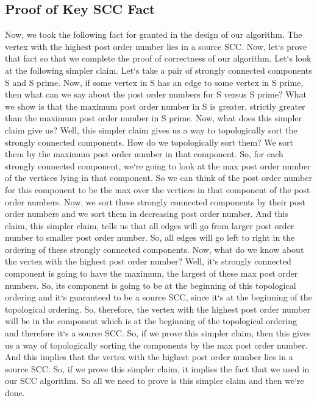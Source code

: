 \subsection{Proof of Key SCC Fact}
Now, we took the following fact for granted in the design of our algorithm.
The vertex with the highest post order number lies in a source SCC\@.
Now, let`s prove that fact so that we complete the proof of correctness of our algorithm.
Let`s look at the following simpler claim.
Let`s take a pair of strongly connected components S and S prime.
Now, if some vertex in S has an edge to some vertex in S prime, then what can we say about the post order numbers for S versus S prime? What we show is that the maximum post order number in S is greater, strictly greater than the maximum post order number in S prime.
Now, what does this simpler claim give us? Well, this simpler claim gives us a way to topologically sort the strongly connected components.
How do we topologically sort them? We sort them by the maximum post order number in that component.
So, for each strongly connected component, we`re going to look at the max post order number of the vertices lying in that component.
So we can think of the post order number for this component to be the max over the vertices in that component of the post order numbers.
Now, we sort these strongly connected components by their post order numbers and we sort them in decreasing post order number.
And this claim, this simpler claim, tells us that all edges will go from larger post order number to smaller post order number.
So, all edges will go left to right in the ordering of these strongly connected components.
Now, what do we know about the vertex with the highest post order number? Well, it`s strongly connected component is going to have the maximum, the largest of these max post order numbers.
So, its component is going to be at the beginning of this topological ordering and it`s guaranteed to be a source SCC, since it`s at the beginning of the topological ordering.
So, therefore, the vertex with the highest post order number will be in the component which is at the beginning of the topological ordering and therefore it`s a source SCC\@.
So, if we prove this simpler claim, then this gives us a way of topologically sorting the components by the max post order number.
And this implies that the vertex with the highest post order number lies in a source SCC\@.
So, if we prove this simpler claim, it implies the fact that we used in our SCC algorithm.
So all we need to prove is this simpler claim and then we`re done.

